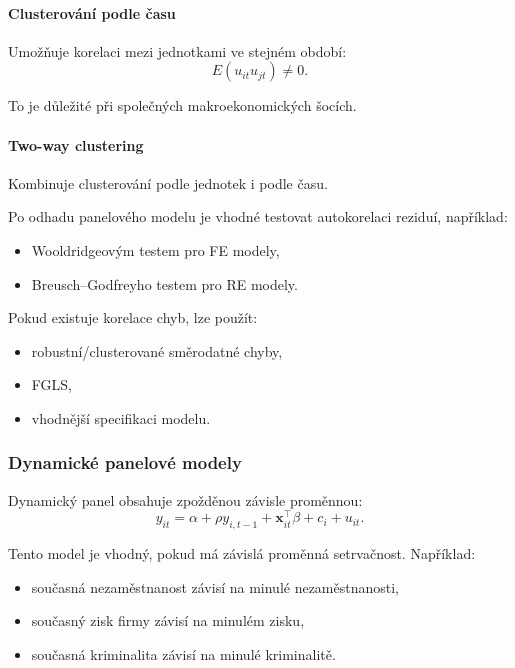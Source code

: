 \paragraph{Clusterování podle času}

Umožňuje korelaci mezi jednotkami ve stejném období:
\[
    E(u_{it}u_{jt})\neq 0.
\]

To je důležité při společných makroekonomických šocích.

\paragraph{Two-way clustering}

Kombinuje clusterování podle jednotek i podle času.

Po odhadu panelového modelu je vhodné testovat autokorelaci reziduí, například:
\begin{itemize}
    \item Wooldridgeovým testem pro FE modely,
    \item Breusch--Godfreyho testem pro RE modely.
\end{itemize}

Pokud existuje korelace chyb, lze použít:
\begin{itemize}
    \item robustní/clusterované směrodatné chyby,
    \item FGLS,
    \item vhodnější specifikaci modelu.
\end{itemize}

\subsubsection{Dynamické panelové modely}

Dynamický panel obsahuje zpožděnou závisle proměnnou:
\[
    y_{it}
    =
    \alpha
    +
    \rho y_{i,t-1}
    +
    \mathbf x_{it}^\top\beta
    +
    c_i
    +
    u_{it}.
\]

Tento model je vhodný, pokud má závislá proměnná setrvačnost. Například:
\begin{itemize}
    \item současná nezaměstnanost závisí na minulé nezaměstnanosti,
    \item současný zisk firmy závisí na minulém zisku,
    \item současná kriminalita závisí na minulé kriminalitě.
\end{itemize}

